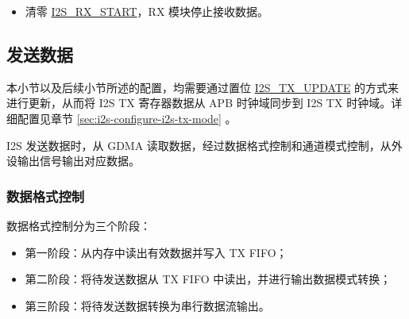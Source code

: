 \documentclass[main\_\_CN.tex]{subfiles}
\begin{document}
\begin{itemize}
\begin{itemize}
\begin{itemize}
            \item 1：RX 模块会在 \hyperref[fielddesc:I2SRXSTART]{I2S\_RX\_START} 被清除，或者接收字节数达到 \hyperref[regdesc:I2SRXEOFNUMREG]{I2S\_RXEOF\_NUM\_REG} 配置的接收长度值时暂停接收。当 \hyperref[fielddesc:I2SRXSTART]{I2S\_RX\_START} 未被清除时，可通过置位 \hyperref[fielddesc:I2SRXRESET]{I2S\_RX\_RESET} 来重新开始接收；
            \item 2：RX 模块会在 \hyperref[fielddesc:I2SRXSTART]{I2S\_RX\_START} 被清除，或 \hyperref[int:I2SRXDONEINT]{I2S\_RX\_DONE\_INT} 的触发条件（由 \hyperref[fielddesc:I2SRXDONEMODE]{I2S\_RX\_DONE\_MODE} 配置，详见章节 \ref{sec:i2s-interrupts} \textit{}）满足时暂停接收。当 \hyperref[fielddesc:I2SRXSTART]{I2S\_RX\_START} 未被清除时，可通过置位 \hyperref[fielddesc:I2SRXRESET]{I2S\_RX\_RESET} 重新启动接收。
        \end{itemize}
        \item 清零 \hyperref[fielddesc:I2SRXSTART]{I2S\_RX\_START}，RX 模块停止接收数据。
    \end{itemize}
\end{itemize}

\subsection{发送数据}\label{sec:i2s-tx-data}

\vspace{1em}
\begin{tiplisting}
本小节以及后续小节所述的配置，均需要通过置位 \hyperref[fielddesc:I2STXUPDATE]{I2S\_TX\_UPDATE} 的方式来进行更新，从而将 I2S TX 寄存器数据从 APB 时钟域同步到 I2S TX 时钟域。详细配置见章节 \ref{sec:i2s-configure-i2s-tx-mode} \textit{}。
\end{tiplisting}
\vspace{-1em}

\chipname{} I2S 发送数据时，从 GDMA 读取数据，经过数据格式控制和通道模式控制，从外设输出信号输出对应数据。
\subsubsection{数据格式控制}\label{sec:i2s-data-control}
数据格式控制分为三个阶段：
\begin{itemize}
    \item 第一阶段：从内存中读出有效数据并写入 TX FIFO；
    \item 第二阶段：将待发送数据从 TX FIFO 中读出，并进行输出数据模式转换；
    \item 第三阶段：将待发送数据转换为串行数据流输出。
\end{itemize}
\end{document}

